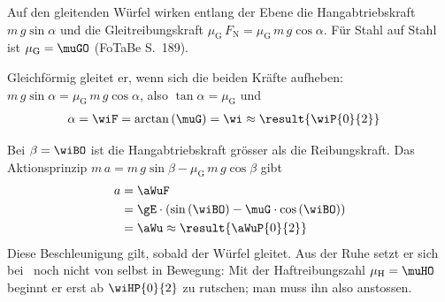 \begin{center}
\end{center}

Auf den gleitenden Würfel wirken entlang der Ebene die Hangabtriebskraft $m\,g\sin\alpha$ und die Gleitreibungskraft $\mu_\mathrm{G}\,F_\mathrm{N} = \mu_\mathrm{G}\,m\,g\cos\alpha$. Für Stahl auf Stahl ist $\mu_\mathrm{G} = \muGO$ (FoTaBe S.~189).

Gleichförmig gleitet er, wenn sich die beiden Kräfte aufheben: $m\,g\sin\alpha = \mu_\mathrm{G}\,m\,g\cos\alpha$, also $\tan\alpha = \mu_\mathrm{G}$ und
\begin{align}
 \alpha &= \wiF = \arctan\left(\muG\right) = \wi \approx \result{\wiP{0}{2}}
\end{align}

Bei $\beta = \wiBO$ ist die Hangabtriebskraft grösser als die Reibungskraft. Das Aktionsprinzip $m\,a = m\,g\sin\beta - \mu_\mathrm{G}\,m\,g\cos\beta$ gibt
\begin{align}
 a &= \aWuF \\
   &= \gE\cdot\left(\sin\left(\wiBO\right)-\muG\cdot\cos\left(\wiBO\right)\right) \\
   &= \aWu \approx \result{\aWuP{0}{2}}
\end{align}
Diese Beschleunigung gilt, sobald der Würfel gleitet. Aus der Ruhe setzt er sich bei \wiBO\ noch nicht von selbst in Bewegung: Mit der Haftreibungszahl $\mu_\mathrm{H} = \muHO$ beginnt er erst ab $\wiHP{0}{2}$ zu rutschen; man muss ihn also anstossen.
